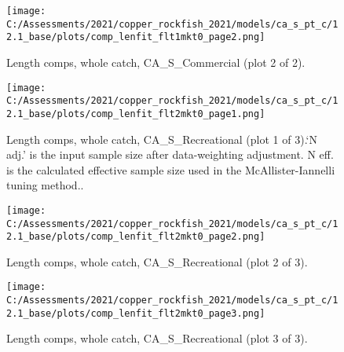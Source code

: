 \documentclass[11pt,
  english,
  a4paper,
]{article}
\begin{document}
\begin{figure}
\centering
\texttt{[image: C:/Assessments/2021/copper\_rockfish\_2021/models/ca\_s\_pt\_c/12.1\_base/plots/comp\_lenfit\_flt1mkt0\_page2.png]}
\caption{Length comps, whole catch, CA\_S\_Commercial (plot 2 of 2).\label{fig:comp_lenfit_flt1mkt0_page2}}
\end{figure}

\tagmcend\tagstructend


\begin{figure}
\centering
\texttt{[image: C:/Assessments/2021/copper\_rockfish\_2021/models/ca\_s\_pt\_c/12.1\_base/plots/comp\_lenfit\_flt2mkt0\_page1.png]}
\caption{Length comps, whole catch, CA\_S\_Recreational (plot 1 of 3).`N adj.' is the input sample size after data-weighting adjustment. N eff. is the calculated effective sample size used in the McAllister-Iannelli tuning method..\label{fig:comp_lenfit_flt2mkt0_page1}}
\end{figure}

\tagmcend\tagstructend


\begin{figure}
\centering
\texttt{[image: C:/Assessments/2021/copper\_rockfish\_2021/models/ca\_s\_pt\_c/12.1\_base/plots/comp\_lenfit\_flt2mkt0\_page2.png]}
\caption{Length comps, whole catch, CA\_S\_Recreational (plot 2 of 3).\label{fig:comp_lenfit_flt2mkt0_page2}}
\end{figure}

\tagmcend\tagstructend


\begin{figure}
\centering
\texttt{[image: C:/Assessments/2021/copper\_rockfish\_2021/models/ca\_s\_pt\_c/12.1\_base/plots/comp\_lenfit\_flt2mkt0\_page3.png]}
\caption{Length comps, whole catch, CA\_S\_Recreational (plot 3 of 3).\label{fig:comp_lenfit_flt2mkt0_page3}}
\end{figure}
\end{document}
